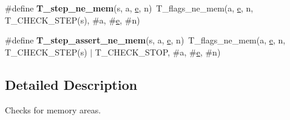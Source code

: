 \begin{DoxyCompactItemize}
\item 
\mbox{\label{group__RTEMSTestFrameworkChecksMemStr_gad1e558298cbc7b9069f6c8a6c7e63e0e}} 
\#define {\bfseries T\+\_\+step\+\_\+ne\+\_\+mem}(s,  a,  \mbox{\hyperlink{sun4u_2tte_8h_a8b0b9ed08e0e18920ec2682f48228c27}{e}},  n)~T\+\_\+flags\+\_\+ne\+\_\+mem(a, \mbox{\hyperlink{sun4u_2tte_8h_a8b0b9ed08e0e18920ec2682f48228c27}{e}}, n, T\+\_\+\+C\+H\+E\+C\+K\+\_\+\+S\+T\+EP(s), \#a, \#\mbox{\hyperlink{sun4u_2tte_8h_a8b0b9ed08e0e18920ec2682f48228c27}{e}}, \#n)
\item 
\mbox{\label{group__RTEMSTestFrameworkChecksMemStr_gaf1125ed3e27ab3479f89e5b2b38122b3}} 
\#define {\bfseries T\+\_\+step\+\_\+assert\+\_\+ne\+\_\+mem}(s,  a,  \mbox{\hyperlink{sun4u_2tte_8h_a8b0b9ed08e0e18920ec2682f48228c27}{e}},  n)~T\+\_\+flags\+\_\+ne\+\_\+mem(a, \mbox{\hyperlink{sun4u_2tte_8h_a8b0b9ed08e0e18920ec2682f48228c27}{e}}, n, T\+\_\+\+C\+H\+E\+C\+K\+\_\+\+S\+T\+EP(s) $\vert$ T\+\_\+\+C\+H\+E\+C\+K\+\_\+\+S\+T\+OP, \#a, \#\mbox{\hyperlink{sun4u_2tte_8h_a8b0b9ed08e0e18920ec2682f48228c27}{e}}, \#n)
\end{DoxyCompactItemize}


\subsection{Detailed Description}
Checks for memory areas. 

